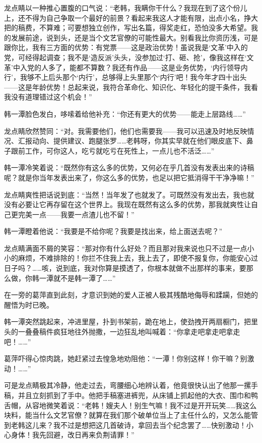 \par 龙点睛以一种推心置腹的口气说：“老韩，我瞒你干什么？我现在到了这个份儿上，还不得为自己争取一个最好的前景？看起来我这人才能有限，出点小名，挣大把的稿费，不算难；可要想独立创作，写出名篇，得奖走红，恐怕没多大希望。我的发展前途，说到头，还是当个文艺官僚的可能性最大。别看我比你资历浅，可是跟你比，我有三方面的优势：有党票——这是政治优势！虽说我是‘文革’中入的党，可经得起调查；我不是‘造反派’头头，没参加过‘打、砸、抢’，像我这样在‘文革’中入党的人多了，能都不算数？我还有作品——这是业务优势，‘内行领导内行’，我够不上后头那个‘内行’，总够得上头里那个‘内行’吧！我今年才四十出头——这是年龄优势！总起来说，我符合革命化、知识化、年轻化的提干条件，我看我没有道理错过这个机会！”
\par 韩一潭脸色发白，哆嗦着给他补充：“你还有更大的优势——能走上层路线……”
\par 龙点睛欣然赞同：“对。我需要他们，他们也需要我——我可以迅速及时地反映情况、汇报动向、提供建议、跑腿张罗……老韩呀，你其实早就在他们眼皮底下、鼻子跟前工作，可你这人，吃亏就吃亏在死性上，一点儿也不活泛……”
\par 韩一潭冷笑着说：“既然你有这么多的优势，又何必在乎几首没有发表出来的诗稿呢？就是你当年发表出来了，你这么多的优势，也足以把它抵消得干干净净嘛！”
\par 龙点睛爽性把话说到底：“当然！当年发了也就发了。可既然没有发出去，我也就没有必要让它再存留在这个世界上。我现在既然有这么多的优势，那我就爽性让自己更完美一点——我要一点渣儿也不留！”
\par 韩一潭瞪着他说：“我要是不给你呢？我要是找出来，给上面送去呢？”
\par 龙点睛满面不屑的笑容：“那对你有什么好处？而且那对我来说也只不过是一点小小的麻烦，不难排除的！你拦不住我上去，我上去了，即使不报复你，你能安心过日子吗？……咳，说到底，我对你算是摸透了，你根本就做不出那样的事来，要那么做，你韩一潭就不是韩一潭了……”
\par 在一旁的葛萍直到此刻，才意识到她的爱人正被人极其残酷地侮辱和蹂躏，但她的醒悟为时已晚。
\par 韩一潭突然跳起来，冲进里屋，扑到书架前，跪在地上，使劲拽开两扇橱门，把里头的一叠叠稿件疯狂地往外抛撒，一边狂乱地叫喊着：“你拿走吧拿走吧拿走吧！……”
\par 葛萍吓得心惊肉跳，她赶紧过去惶急地劝阻他：“一潭！你别这样！你干嘛？别激动！……”
\par 可是龙点睛极其冷静，他走过去，弯腰细心地辨认着，他竟很快认出了他那一摞手稿，并且立刻抓到了手中。他把手稿塞进裤兜，从床铺上抓起他的大衣、围巾和鸭舌帽，从容地微笑着说：“老韩！嫂夫人！别生气嘛！我不过是开开玩笑……我这么块料，能当什么文艺官僚？就算在我们那个破单位当上了主任什么的，又怎么能管到老韩这儿来？我不过是想把这几首破诗，拿回去当个纪念罢了……快别激动！小心身体！我先回避，改日再来负荆请罪！”

